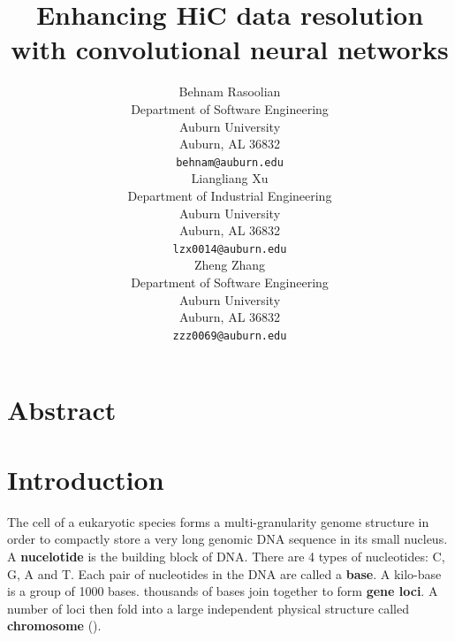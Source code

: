 \documentclass{article}
\begin{document}
\title{Enhancing HiC data resolution with convolutional neural networks}

\author{
    Behnam Rasoolian \\
    Department of Software Engineering \\
    Auburn University \\
    Auburn, AL 36832 \\
    \texttt{behnam@auburn.edu} \\
    \And
    Liangliang Xu \\
    Department of Industrial Engineering \\
    Auburn University \\
    Auburn, AL 36832 \\
    \texttt{lzx0014@auburn.edu} \\
    \And
    Zheng Zhang \\
    Department of Software Engineering \\
    Auburn University \\
    Auburn, AL 36832 \\
    \texttt{zzz0069@auburn.edu} \\
}

\maketitle
\section{Abstract}
\section{Introduction}
The cell of a eukaryotic species forms a multi-granularity genome structure
in order to compactly store a very long genomic 
DNA sequence in its small nucleus. 
A \textbf{nucelotide} is the building block of
DNA. There are 4 types of nucleotides: 
C, G, A and T. 
Each pair of nucleotides in the DNA are called a \textbf{base}.
A kilo-base is a group of 1000 bases.
thousands of bases join together to form \textbf{gene loci}.
A number of loci then fold into a large
independent physical structure called \textbf{chromosome}
        (\cite{wang2013properties}).
\end{document}
